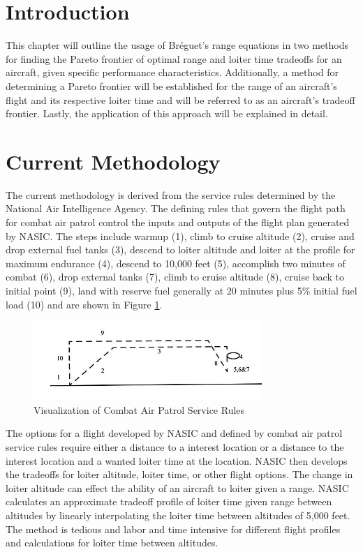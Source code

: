 \section{Introduction}
This chapter will outline the usage of Br\'eguet's range equations in two methods for finding the Pareto frontier of optimal range and loiter time tradeoffs for an aircraft, given specific performance characteristics. Additionally, a method for determining a Pareto frontier will be established for the range of an aircraft's flight and its respective loiter time and will be referred to as an aircraft's tradeoff frontier. Lastly, the application of this approach will be explained in detail.\par
\section{Current Methodology}
The current methodology is derived from the service rules determined by the National Air Intelligence Agency. The defining rules that govern the flight path for combat air patrol control the inputs and outputs of the flight plan generated by NASIC. The steps include warmup (1), climb to cruise altitude (2), cruise and drop external fuel tanks (3), descend to loiter altitude and loiter at the profile for maximum endurance (4), descend to 10,000 feet (5), accomplish two minutes of combat (6), drop external tanks (7), climb to cruise altitude (8), cruise back to initial point (9), land with reserve fuel generally at 20 minutes plus 5\% initial fuel load (10) and are shown in Figure \ref{fig: serviceRules}.\par
\begin{figure}[H]
    \centering
    \includegraphics{Thesis/Method/CombatServiceRules.PNG}
    \caption{Visualization of Combat Air Patrol Service Rules}
    \label{fig: serviceRules}
\end{figure}
The options for a flight developed by NASIC and defined by combat air patrol service rules require either a distance to a interest location or a distance to the interest location and a wanted loiter time at the location. NASIC then develops the tradeoffs for loiter altitude, loiter time, or other flight options. The change in loiter altitude can effect the ability of an aircraft to loiter given a range. NASIC calculates an approximate tradeoff profile of loiter time given range between altitudes by linearly interpolating the loiter time between altitudes of 5,000 feet. The method is tedious and labor and time intensive for different flight profiles and calculations for loiter time between altitudes.
